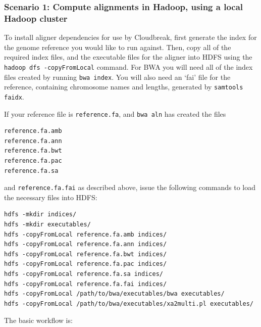 \documentclass[11pt]{article}
\begin{document}
\subsubsection{Scenario 1: Compute alignments in Hadoop, using a local Hadoop cluster}
\label{scenario1:computealignmentsinhadoopusingalocalhadoopcluster}

To install aligner dependencies for use by Cloudbreak, first generate the index
for the genome reference you would like to run against. Then, copy all of the
required index files, and the executable files for the aligner into HDFS using
the \texttt{hadoop dfs -copyFromLocal} command. For BWA you will need all of the index files
created by running \texttt{bwa index}. You will also need an `fai' file for the reference,
containing chromosome names and lengths, generated by \texttt{samtools faidx}.

If your reference file is \texttt{reference.fa}, and \texttt{bwa aln} has created the files

\begin{verbatim}
reference.fa.amb
reference.fa.ann
reference.fa.bwt
reference.fa.pac
reference.fa.sa
\end{verbatim}

and \texttt{reference.fa.fai} as described above, issue the following
commands to load the necessary files into HDFS:

\begin{verbatim}
hdfs -mkdir indices/
hdfs -mkdir executables/
hdfs -copyFromLocal reference.fa.amb indices/
hdfs -copyFromLocal reference.fa.ann indices/
hdfs -copyFromLocal reference.fa.bwt indices/
hdfs -copyFromLocal reference.fa.pac indices/
hdfs -copyFromLocal reference.fa.sa indices/
hdfs -copyFromLocal reference.fa.fai indices/
hdfs -copyFromLocal /path/to/bwa/executables/bwa executables/
hdfs -copyFromLocal /path/to/bwa/executables/xa2multi.pl executables/
\end{verbatim}

The basic workflow is:
\end{document}
